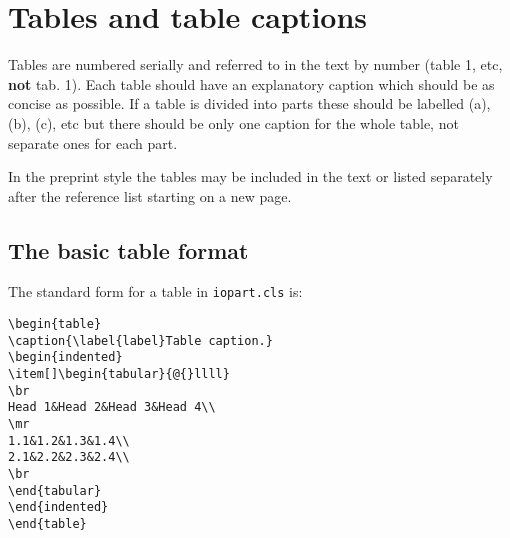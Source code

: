 \documentclass[12pt]{iopart}
\begin{document}
\section{Tables and table captions}
Tables are numbered serially and referred to in the text 
by number (table 1, etc, {\bf not} tab. 1). Each table should have an 
explanatory caption which should be as concise as possible. If a table 
is divided into parts these should be labelled \pt(a), \pt(b), 
\pt(c), etc but there should be only one caption for the whole 
table, not separate ones for each part.

In the preprint style the tables may be included in the text 
or listed separately after the reference list 
starting on a new page. 

\subsection{The basic table format}
The standard form for a table in \verb"iopart.cls" is:
\small\begin{verbatim}
\begin{table}
\caption{\label{label}Table caption.}
\begin{indented}
\item[]\begin{tabular}{@{}llll}
\br
Head 1&Head 2&Head 3&Head 4\\
\mr
1.1&1.2&1.3&1.4\\
2.1&2.2&2.3&2.4\\
\br
\end{tabular}
\end{indented}
\end{table}
\end{verbatim}\normalsize
\end{document}
